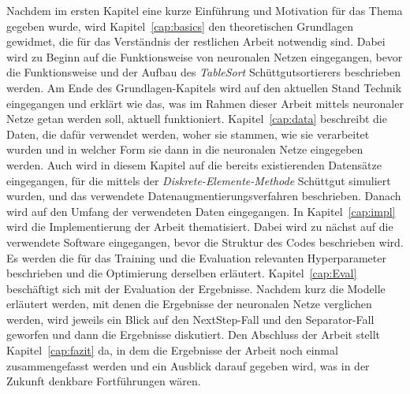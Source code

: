 Nachdem im ersten Kapitel eine kurze Einführung und Motivation für das Thema gegeben wurde, 
wird Kapitel~\ref{cap:basics} den theoretischen Grundlagen gewidmet, die für das Verständnis der restlichen Arbeit notwendig sind.
Dabei wird zu Beginn auf die Funktionsweise von neuronalen Netzen eingegangen, 
bevor die Funktionsweise und der Aufbau des \textit{TableSort} Schüttgutsortierers beschrieben werden.
Am Ende des Grundlagen-Kapitels wird auf den aktuellen Stand Technik eingegangen und erklärt wie das, 
was im Rahmen dieser Arbeit mittels neuronaler Netze getan werden soll, aktuell funktioniert.
Kapitel~\ref{cap:data} beschreibt die Daten, die dafür verwendet werden,
woher sie stammen, wie sie verarbeitet wurden und in welcher Form sie dann in die neuronalen Netze eingegeben werden.
Auch wird in diesem Kapitel auf die bereits existierenden Datensätze eingegangen, für die mittels der \textit{Diskrete-Elemente-Methode} Schüttgut simuliert wurden,
und das verwendete Datenaugmentierungsverfahren beschrieben.
Danach wird auf den Umfang der verwendeten Daten eingegangen.
In Kapitel~\ref{cap:impl} wird die Implementierung der Arbeit thematisiert.
Dabei wird zu nächst auf die verwendete Software eingegangen, bevor die Struktur des Codes beschrieben wird.
Es werden die für das Training und die Evaluation relevanten Hyperparameter beschrieben und die Optimierung derselben erläutert.
Kapitel~\ref{cap:Eval} beschäftigt sich mit der Evaluation der Ergebnisse.
Nachdem kurz die Modelle erläutert werden, mit denen die Ergebnisse der neuronalen Netze verglichen werden,
wird jeweils ein Blick auf den NextStep-Fall und den Separator-Fall geworfen und dann die Ergebnisse diskutiert.
Den Abschluss der Arbeit stellt Kapitel~\ref{cap:fazit} da, in dem die Ergebnisse der Arbeit noch einmal zusammengefasst werden 
und ein Ausblick darauf gegeben wird, was in der Zukunft denkbare Fortführungen wären.

